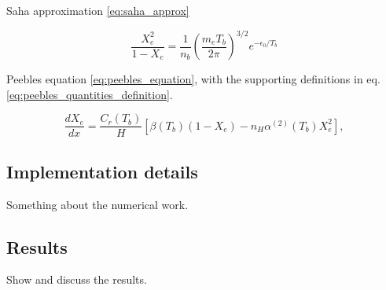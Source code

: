 Saha approximation \ref{eq:saha_approx}

\begin{equation}\label{eq:saha_approx}
\boxed{\frac{X_e^2}{1-X_e} = \frac{1}{n_b} \left(\frac{m_e
T_b}{2\pi}\right)^{3/2} e^{-\epsilon_0/T_b}}
\end{equation}

Peebles equation \ref{eq:peebles_equation}, with the supporting definitions in eq. \ref{eq:peebles_quantities_definition}.

\begin{equation}\label{eq:peebles_equation}
\boxed{\frac{dX_e}{dx} = \frac{C_r(T_b)}{H} \left[\beta(T_b)(1-X_e) - n_H
\alpha^{(2)}(T_b)X_e^2\right],}
\end{equation}

\subsection{Implementation details}
Something about the numerical work.

\subsection{Results}
Show and discuss the results.
